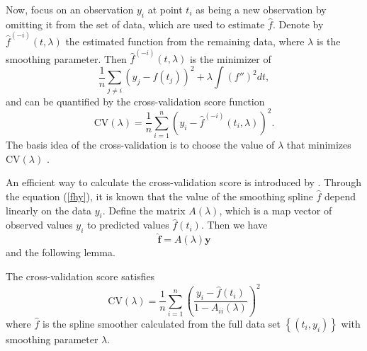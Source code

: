 Now, focus on an observation $y_i$ at point $t_i$ as being a new observation by omitting it from the set of data, which are used to estimate $\hat{f}$. Denote by $\hat{f}^{(-i)}(t,\lambda)$ the estimated function from the remaining data, where $\lambda$ is the smoothing parameter. Then $\hat{f}^{(-i)}\left(t,\lambda\right)$ is the minimizer of  
\begin{equation}\label{originalcv}
\frac{1}{n}\sum_{j \neq i}\left(y_j-f(t_j) \right)^2+\lambda\int (f'')^2dt,
\end{equation}
and can be quantified by the cross-validation score function
\begin{equation*}
\mbox{CV}(\lambda)=\frac{1}{n}\sum_{i=1}^{n}\left(  y_i-\hat{f}^{(-i)}(t_i,\lambda)\right) ^2.
\end{equation*}
The basis idea of the cross-validation is to choose the value of $\lambda$ that minimizes $\mbox{CV}(\lambda)$ \citep{green1993nonparametric}. 

An efficient way to calculate the cross-validation score is introduced by \citep{green1993nonparametric}. Through the equation (\ref{fhy}), it is known that the value of the smoothing spline $\hat{f}$ depend linearly on the data $y_i$. Define the matrix $A(\lambda)$, which is a map vector of observed values $y_i$ to predicted values $\hat{f}(t_i)$. Then we have
\begin{equation*}\label{crossvalidationmatrixA}
\hat{\mathbf{f}}=A(\lambda)\mathbf{y}
\end{equation*}
and the following lemma.
\begin{lemma}\label{cvlema}
The cross-validation score satisfies
\begin{equation*}
\mbox{CV}(\lambda)=\frac{1}{n} \sum_{i=1}^n \left(\frac{y_i-\hat{f}(t_i)}{1-A_{ii}(\lambda)}\right)^2
\end{equation*}
where $\hat{f}$ is the spline smoother calculated from the full data set $\left\lbrace (t_i,y_i)\right\rbrace$ with smoothing parameter $\lambda$.
\end{lemma}

